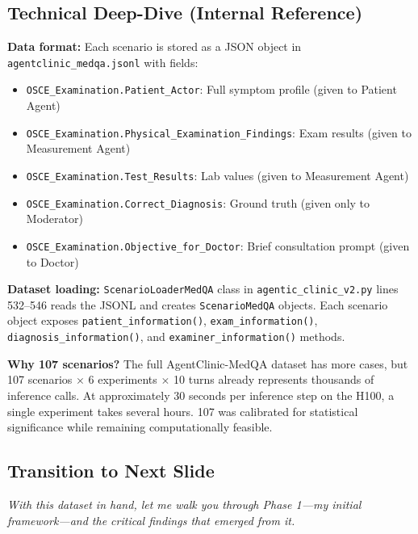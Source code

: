 \documentclass[12pt]{article}
\begin{document}
  \subsection*{Technical Deep-Dive (Internal Reference)}
  {\color{techgray}
  \textbf{Data format:} Each scenario is stored as a JSON object in \texttt{agentclinic\_medqa.jsonl} with fields:
  \begin{itemize}
    \item \texttt{OSCE\_Examination.Patient\_Actor}: Full symptom profile (given to Patient Agent)
    \item \texttt{OSCE\_Examination.Physical\_Examination\_Findings}: Exam results (given to Measurement Agent)
    \item \texttt{OSCE\_Examination.Test\_Results}: Lab values (given to Measurement Agent)
    \item \texttt{OSCE\_Examination.Correct\_Diagnosis}: Ground truth (given only to Moderator)
    \item \texttt{OSCE\_Examination.Objective\_for\_Doctor}: Brief consultation prompt (given to Doctor)
  \end{itemize}

  \textbf{Dataset loading:} \texttt{ScenarioLoaderMedQA} class in \texttt{agentic\_clinic\_v2.py} lines 532--546 reads the JSONL and creates \texttt{ScenarioMedQA} objects. Each scenario object exposes \texttt{patient\_information()}, \texttt{exam\_information()}, \texttt{diagnosis\_information()}, and \texttt{examiner\_information()} methods.

  \textbf{Why 107 scenarios?} The full AgentClinic-MedQA dataset has more cases, but 107 scenarios $\times$ 6 experiments $\times$ 10 turns already represents thousands of inference calls. At approximately 30 seconds per inference step on the H100, a single experiment takes several hours. 107 was calibrated for statistical significance while remaining computationally feasible.
  }

  \subsection*{Transition to Next Slide}
  {\color{transgreen}
  \textit{With this dataset in hand, let me walk you through Phase 1---my initial framework---and the critical findings that emerged from it.}
  }
\end{document}
